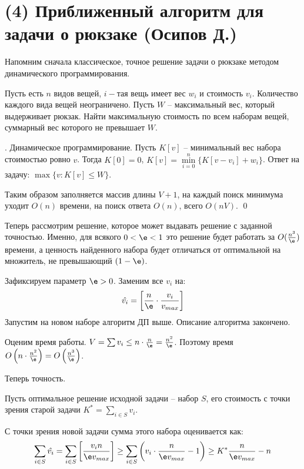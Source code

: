 \section{(4) Приближенный алгоритм для задачи о рюкзаке (Осипов Д.)} 
Напомним сначала классическое, точное решение задачи о рюкзаке методом динамического программирования.

 Пусть есть $n$ видов вещей, $i-$тая вещь имеет вес $w_i$ и стоимость $v_i$. Количество каждого вида вещей неограничено. Пусть $W$ -- максимальный вес, который выдерживает рюкзак. Найти максимальную стоимость по всем наборам вещей, суммарный вес которого не превышает $W$.

. Динамическое программирование. Пусть $K[v]$ -- минимальный вес набора стоимостью ровно $v$. Тогда $K[0] = 0$, $K[v] = \underset{i=0}{\overset{n}{\min}} \{K[v-v_i] + w_i\}$. Ответ на задачу: $\max\{v : K[v] \leq W\}$. 

Таким образом заполняется массив длины $V+1$, на каждый поиск минимума уходит $O(n)$ времени, на поиск ответа $O(n)$, всего $O(nV)$.  \qed

Теперь рассмотрим решение, которое может выдавать решение с заданной точностью. Именно, для всякого $0 < \e < 1$ это решение будет работать за $O(\frac{n^3}{\e})$ времени, а ценность найденного набора будет отличаться от оптимальной на множитель, не превышающий $(1-\e)$.


Зафиксируем параметр $\e>0$. Заменим все $v_i$ на: $$\hat{v_i} = \left[\frac{n}{\e} \cdot \frac{v_i}{v_{max}}\right]$$ Запустим на новом наборе алгоритм ДП выше. Описание алгоритма закончено.

Оценим время работы. $V = \sum v_i \leq n\cdot \frac{n}{\e} = \frac{n^2}{\e}$. Поэтому время $O\left(n \cdot \frac{n^2}{\e}\right) = O\left(\frac{n^3}{\e}\right)$.

Теперь точность. 

Пусть оптимальное решение исходной задачи -- набор $S$, его стоимость с точки зрения старой задачи $K^* = \sum\limits_{i\in S} v_i$.

С точки зрения новой задачи сумма этого набора оценивается как: 
$$\sum_{i\in S}\hat{v_i} = \sum_{i\in S} \left[\frac{v_i n}{\e v_{max}}\right] \geq \sum_{i\in S} \left(v_i \cdot \frac{n}{\e v_{max}} - 1\right) \geq K^*\frac{n}{\e v_{max}} - n$$

